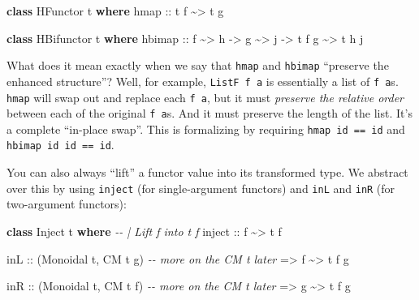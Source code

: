 \documentclass[]{article}
\newenvironment{Shaded}{}{}
\newcommand{\CommentTok}[1]{\textcolor[rgb]{0.38,0.63,0.69}{\textit{#1}}}
\newcommand{\DataTypeTok}[1]{\textcolor[rgb]{0.56,0.13,0.00}{#1}}
\newcommand{\KeywordTok}[1]{\textcolor[rgb]{0.00,0.44,0.13}{\textbf{#1}}}
\newcommand{\NormalTok}[1]{#1}
\newcommand{\OperatorTok}[1]{\textcolor[rgb]{0.40,0.40,0.40}{#1}}
\newcommand{\OtherTok}[1]{\textcolor[rgb]{0.00,0.44,0.13}{#1}}
\begin{document}
\begin{Shaded}
\begin{Highlighting}[]
\KeywordTok{class} \DataTypeTok{HFunctor}\NormalTok{ t }\KeywordTok{where}
\NormalTok{    hmap}
\OtherTok{        ::}\NormalTok{ t f }\OperatorTok{\textasciitilde{}>}\NormalTok{ t g}

\KeywordTok{class} \DataTypeTok{HBifunctor}\NormalTok{ t }\KeywordTok{where}
\NormalTok{    hbimap}
\OtherTok{        ::}\NormalTok{ f }\OperatorTok{\textasciitilde{}>}\NormalTok{ h}
        \OtherTok{{-}>}\NormalTok{ g }\OperatorTok{\textasciitilde{}>}\NormalTok{ j}
        \OtherTok{{-}>}\NormalTok{ t f g }\OperatorTok{\textasciitilde{}>}\NormalTok{ t h j}
\end{Highlighting}
\end{Shaded}

What does it mean exactly when we say that \texttt{hmap} and \texttt{hbimap}
``preserve the enhanced structure''? Well, for example, \texttt{ListF\ f\ a} is
essentially a list of \texttt{f\ a}s. \texttt{hmap} will swap out and replace
each \texttt{f\ a}, but it must \emph{preserve the relative order} between each
of the original \texttt{f\ a}s. And it must preserve the length of the list.
It's a complete ``in-place swap''. This is formalizing by requiring
\texttt{hmap\ id\ ==\ id} and \texttt{hbimap\ id\ id\ ==\ id}.

You can also always ``lift'' a functor value into its transformed type. We
abstract over this by using \texttt{inject} (for single-argument functors) and
\texttt{inL} and \texttt{inR} (for two-argument functors):

\begin{Shaded}
\begin{Highlighting}[]
\KeywordTok{class} \DataTypeTok{Inject}\NormalTok{ t }\KeywordTok{where}
    \CommentTok{{-}{-} | Lift \textasciigrave{}f\textasciigrave{} into \textasciigrave{}t f\textasciigrave{}}
\OtherTok{    inject ::}\NormalTok{ f }\OperatorTok{\textasciitilde{}>}\NormalTok{ t f}

\OtherTok{inL ::}\NormalTok{ (}\DataTypeTok{Monoidal}\NormalTok{ t, }\DataTypeTok{CM}\NormalTok{ t g)     }\CommentTok{{-}{-} more on the \textasciigrave{}CM t\textasciigrave{} later}
    \OtherTok{=>}\NormalTok{ f }\OperatorTok{\textasciitilde{}>}\NormalTok{ t f g}

\OtherTok{inR ::}\NormalTok{ (}\DataTypeTok{Monoidal}\NormalTok{ t, }\DataTypeTok{CM}\NormalTok{ t f)     }\CommentTok{{-}{-} more on the \textasciigrave{}CM t\textasciigrave{} later}
    \OtherTok{=>}\NormalTok{ g }\OperatorTok{\textasciitilde{}>}\NormalTok{ t f g}
\end{Highlighting}
\end{Shaded}
\end{document}
